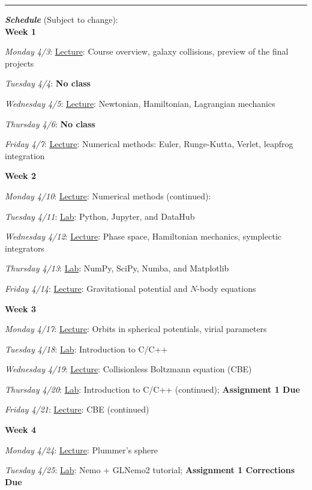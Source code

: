 \documentclass[12pt]{article}
\begin{document}
\begin{center}
  \rule{\textwidth}{0.5pt}
\end{center}

\noindent\textbf{\emph{Schedule}} (Subject to change):\\

\noindent\textbf{Week 1}

\emph{Monday 4/3}: \underline{Lecture}: Course overview, galaxy collisions, preview of the final projects

\emph{Tuesday 4/4}: \textbf{No class}

\emph{Wednesday 4/5}: \underline{Lecture}: Newtonian, Hamiltonian, Lagrangian mechanics

\emph{Thursday 4/6}: \textbf{No class}

\emph{Friday 4/7}: \underline{Lecture}: Numerical methods: Euler, Runge-Kutta, Verlet, leapfrog integration

\noindent\textbf{Week 2}

\emph{Monday 4/10}: \underline{Lecture}: Numerical methods (continued):

\emph{Tuesday 4/11}: \underline{Lab}: Python, Jupyter, and DataHub

\emph{Wednesday 4/12}: \underline{Lecture}: Phase space, Hamiltonian mechanics, symplectic integrators

\emph{Thursday 4/13}: \underline{Lab}: NumPy, SciPy, Numba, and Matplotlib

\emph{Friday 4/14}: \underline{Lecture}: Gravitational potential and $N$-body equations

\noindent\textbf{Week 3}

\emph{Monday 4/17}: \underline{Lecture}: Orbits in spherical potentials, virial parameters

\emph{Tuesday 4/18}: \underline{Lab}: Introduction to C/C++

\emph{Wednesday 4/19}: \underline{Lecture}: Collisionless Boltzmann equation (CBE)

\emph{Thursday 4/20}: \underline{Lab}: Introduction to C/C++ (continued); \textbf{Assignment 1 Due}

\emph{Friday 4/21}: \underline{Lecture}: CBE (continued)

\noindent\textbf{Week 4}

\emph{Monday 4/24}: \underline{Lecture}: Plummer's sphere

\emph{Tuesday 4/25}: \underline{Lab}: Nemo + GLNemo2 tutorial; \textbf{Assignment 1 Corrections Due}
\end{document}
